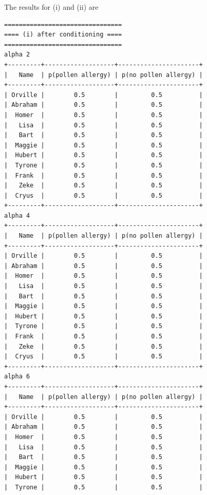 \documentclass{article}
\begin{document}
The results for (i) and (ii) are
\lstset{language=Python}
\lstset{frame=lines}
\lstset{basicstyle=\footnotesize}
\begin{lstlisting}
================================
==== (i) after conditioning ====
================================
alpha 2
+---------+-------------------+----------------------+
|   Name  | p(pollen allergy) | p(no pollen allergy) |
+---------+-------------------+----------------------+
| Orville |        0.5        |         0.5          |
| Abraham |        0.5        |         0.5          |
|  Homer  |        0.5        |         0.5          |
|   Lisa  |        0.5        |         0.5          |
|   Bart  |        0.5        |         0.5          |
|  Maggie |        0.5        |         0.5          |
|  Hubert |        0.5        |         0.5          |
|  Tyrone |        0.5        |         0.5          |
|  Frank  |        0.5        |         0.5          |
|   Zeke  |        0.5        |         0.5          |
|  Cryus  |        0.5        |         0.5          |
+---------+-------------------+----------------------+
alpha 4
+---------+-------------------+----------------------+
|   Name  | p(pollen allergy) | p(no pollen allergy) |
+---------+-------------------+----------------------+
| Orville |        0.5        |         0.5          |
| Abraham |        0.5        |         0.5          |
|  Homer  |        0.5        |         0.5          |
|   Lisa  |        0.5        |         0.5          |
|   Bart  |        0.5        |         0.5          |
|  Maggie |        0.5        |         0.5          |
|  Hubert |        0.5        |         0.5          |
|  Tyrone |        0.5        |         0.5          |
|  Frank  |        0.5        |         0.5          |
|   Zeke  |        0.5        |         0.5          |
|  Cryus  |        0.5        |         0.5          |
+---------+-------------------+----------------------+
alpha 6
+---------+-------------------+----------------------+
|   Name  | p(pollen allergy) | p(no pollen allergy) |
+---------+-------------------+----------------------+
| Orville |        0.5        |         0.5          |
| Abraham |        0.5        |         0.5          |
|  Homer  |        0.5        |         0.5          |
|   Lisa  |        0.5        |         0.5          |
|   Bart  |        0.5        |         0.5          |
|  Maggie |        0.5        |         0.5          |
|  Hubert |        0.5        |         0.5          |
|  Tyrone |        0.5        |         0.5          |

\end{lstlisting}
\end{document}
